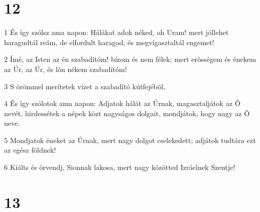 \chapter{12}

\par 1 És így szólsz ama napon: Hálákat adok néked, oh Uram! mert jóllehet haragudtál reám, de elfordult haragod, és megvígasztaltál engemet!
\par 2 Ímé, az Isten az én szabadítóm! bízom és nem félek; mert erõsségem és énekem az Úr, az Úr, és lõn nékem szabadítóm!
\par 3 S örömmel merítetek vizet a szabadító kútfejébõl,
\par 4 És így szólotok ama napon: Adjatok hálát az Úrnak, magasztaljátok az Õ nevét, hirdessétek a népek közt nagyságos dolgait, mondjátok, hogy nagy az Õ neve.
\par 5 Mondjatok éneket az Úrnak, mert nagy dolgot cselekedett; adjátok tudtára ezt az egész földnek!
\par 6 Kiálts és örvendj, Sionnak lakosa, mert nagy közötted Izráelnek Szentje!

\chapter{13}

